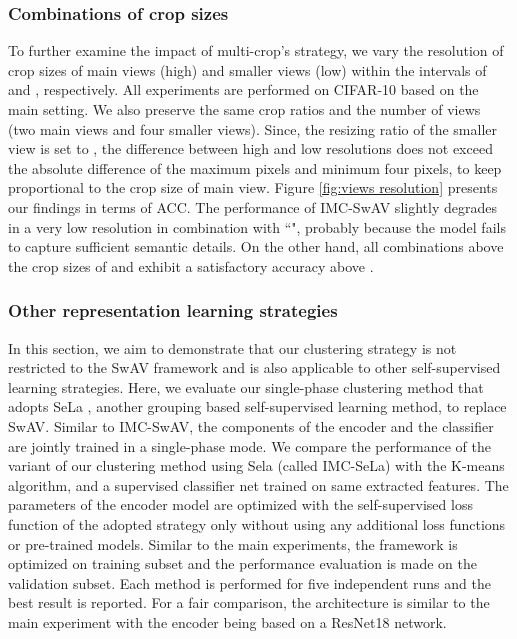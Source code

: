 \documentclass[journal]{IEEEtran}
\begin{document}
\subsubsection{Combinations of crop sizes} 
To further examine the impact of multi-crop's strategy, we vary the resolution of crop sizes of main views (high) and smaller views (low) within the intervals of  and , respectively. All experiments are performed on CIFAR-10 based on the main setting. We also preserve the same crop ratios and the number of views (two main views and four smaller views). Since, the resizing ratio of the smaller view is set to , the difference between high and low resolutions does not exceed the absolute difference of the maximum  pixels and minimum four pixels, to keep proportional to the crop size of main view. Figure \ref{fig:views resolution} presents our findings in terms of ACC. The performance of IMC-SwAV slightly degrades in a very low resolution in combination with ``", probably because the model fails to capture sufficient semantic details. On the other hand, all combinations above the crop sizes of  and  exhibit a satisfactory accuracy above .



\subsubsection{Other representation learning strategies}  
In this section, we aim to demonstrate that our clustering strategy is not restricted to the SwAV \cite{caron2020unsupervised} framework and is also applicable to other self-supervised learning strategies. Here, we evaluate our single-phase clustering method that adopts SeLa \cite{asano2020self}, another grouping based self-supervised learning method, to replace SwAV. Similar to IMC-SwAV, the components of the encoder and the classifier are jointly trained in a single-phase mode. We compare the performance of the variant of our clustering method using Sela (called IMC-SeLa) with the K-means algorithm, and a supervised classifier net trained on same extracted features. The parameters of the encoder model are optimized with the self-supervised loss function of the adopted strategy only without using any additional loss functions or pre-trained models. Similar to the main experiments, the framework is optimized on training subset and the performance evaluation is made on the validation subset. Each method is performed for five independent runs and the best result is reported. For a fair comparison, the architecture is similar to the main experiment with the encoder being based on a ResNet18 network. \par
\end{document}
